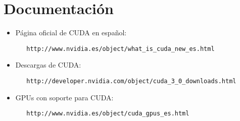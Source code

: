 \section{Documentación}
\begin{itemize}
 \item Página oficial de CUDA en español:
  \begin{verbatim}
   http://www.nvidia.es/object/what_is_cuda_new_es.html
  \end{verbatim}
 \item Descargas de CUDA:
  \begin{verbatim}
   http://developer.nvidia.com/object/cuda_3_0_downloads.html
  \end{verbatim}
 \item GPUs con soporte para CUDA:
  \begin{verbatim}
   http://www.nvidia.es/object/cuda_gpus_es.html
  \end{verbatim}
\end{itemize}

